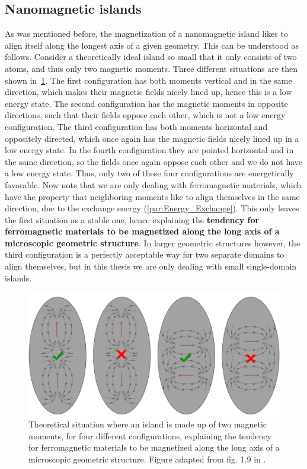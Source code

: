 \documentclass[12pt,a4paper]{article}
\begin{document}
\subsection{Nanomagnetic islands}
As was mentioned before, the magnetization of a nanomagnetic island likes to align itself along the longest axis of a given geometry. This can be understood as follows. Consider a theoretically ideal island so small that it only consists of two atoms, and thus only two magnetic moments. Three different situations are then shown in~\cref{fig:Intro_IslandEllipticPreferredDirection}.
The first configuration has both moments vertical and in the same direction, which makes their magnetic fields nicely lined up, hence this is a low energy state. The second configuration has the magnetic moments in opposite directions, such that their fields oppose each other, which is not a low energy configuration. The third configuration has both moments horizontal and oppositely directed, which once again has the magnetic fields nicely lined up in a low energy state. In the fourth configuration they are pointed horizontal and in the same direction, so the fields once again oppose each other and we do not have a low energy state. Thus, only two of these four configurations are energetically favorable. Now note that we are only dealing with ferromagnetic materials, which have the property that neighboring moments like to align themselves in the same direction, due to the exchange energy (\cref{par:Energy_Exchange}). This only leaves the first situation as a stable one, hence explaining the \textbf{tendency for ferromagnetic materials to be magnetized along the long axis of a microscopic geometric structure}. In larger geometric structures however, the third configuration is a perfectly acceptable way for two separate domains to align themselves, but in this thesis we are only dealing with small single-domain islands. \par
\begin{figure}[t]
    \centering
    \includegraphics[width=0.8\columnwidth]{Figures/Introduction/NML_Carlton - Figure 1.9 adapted.png}
    \caption{Theoretical situation where an island is made up of two magnetic moments, for four different configurations, explaining the tendency for ferromagnetic materials to be magnetized along the long axis of a microscopic geometric structure. Figure adapted from fig. 1.9 in \cite{NML_Carlton}.}
    \label{fig:Intro_IslandEllipticPreferredDirection}
\end{figure}
\end{document}
